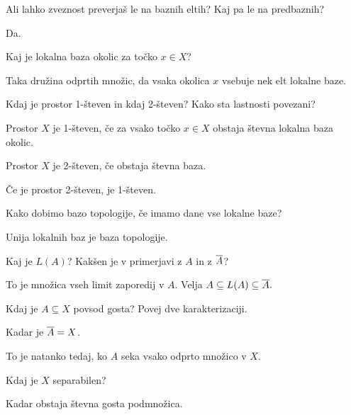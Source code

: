 \begin{vo}{Ali lahko zveznost preverjaš le na baznih eltih?
  Kaj pa le na predbaznih?}

Da.

\end{vo}

\begin{vo}{Kaj je lokalna baza okolic za točko $x \in X$?}

Taka družina odprtih množic, da vsaka okolica $x$ vsebuje nek elt lokalne baze.

\end{vo}

\begin{vo}{Kdaj je prostor 1-števen in kdaj 2-števen?
  Kako sta lastnosti povezani?}

Prostor $X$ je 1-števen, če za vsako točko $x \in X$ obstaja
števna lokalna baza okolic.

Prostor $X$ je 2-števen, če obstaja števna baza.

Če je prostor 2-števen, je 1-števen.

\end{vo}

\begin{vo}{Kako dobimo bazo topologije, če imamo dane vse lokalne baze?}

Unija lokalnih baz je baza topologije.

\end{vo}

\begin{vo}{Kaj je $L(A)$? Kakšen je v primerjavi z $A$ in z $\overline{A}$?}

To je množica vseh limit zaporedij v $A$.
Velja $A \subseteq L(A) \subseteq \overline{A}.$

\end{vo}

\begin{vo}{Kdaj je $A \subseteq X$ povsod gosta? Povej dve karakterizaciji.}

Kadar je $\overline{A} = X$.

To je natanko tedaj, ko $A$ seka vsako odprto množico v $X$.

\end{vo}

\begin{vo}{Kdaj je $X$ separabilen?}

Kadar obstaja števna gosta podmnožica.

\end{vo}

